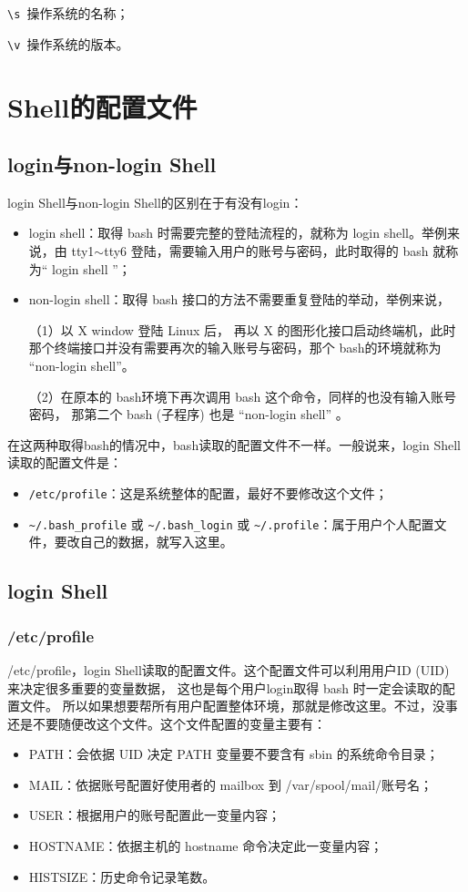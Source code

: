 \verb|\s |操作系统的名称；

\verb|\v |操作系统的版本。




\section{Shell的配置文件}
\subsection{login与non-login Shell}
login Shell与non-login Shell的区别在于有没有login：
\begin{itemize}
\item login shell：取得 bash 时需要完整的登陆流程的，就称为 login shell。举例来说，由 tty1$\sim$tty6 登陆，需要输入用户的账号与密码，此时取得的 bash 就称为“ login shell ”；

\item non-login shell：取得 bash 接口的方法不需要重复登陆的举动，举例来说，

\qquad（1）以 X window 登陆 Linux 后， 再以 X 的图形化接口启动终端机，此时那个终端接口并没有需要再次的输入账号与密码，那个 bash的环境就称为 “non-login shell”。

\qquad （2）在原本的 bash环境下再次调用 bash 这个命令，同样的也没有输入账号密码， 那第二个 bash (子程序) 也是 “non-login shell” 。
\end{itemize}

在这两种取得bash的情况中，bash读取的配置文件不一样。一般说来，login Shell读取的配置文件是：
\begin{itemize}
\item \verb|/etc/profile|：这是系统整体的配置，最好不要修改这个文件；

\item \verb|~/.bash_profile| 或 \verb|~/.bash_login| 或 \verb|~/.profile|：属于用户个人配置文件，要改自己的数据，就写入这里。
\end{itemize}


\subsection{login Shell}
\subsubsection{/etc/profile}
/etc/profile，login Shell读取的配置文件。这个配置文件可以利用用户ID (UID) 来决定很多重要的变量数据， 这也是每个用户login取得 bash 时一定会读取的配置文件。 所以如果想要帮所有用户配置整体环境，那就是修改这里。不过，没事还是不要随便改这个文件。这个文件配置的变量主要有：
\begin{itemize}
\item PATH：会依据 UID 决定 PATH 变量要不要含有 sbin 的系统命令目录；
\item MAIL：依据账号配置好使用者的 mailbox 到 /var/spool/mail/账号名；
\item USER：根据用户的账号配置此一变量内容；
\item HOSTNAME：依据主机的 hostname 命令决定此一变量内容；
\item HISTSIZE：历史命令记录笔数。
\end{itemize}

